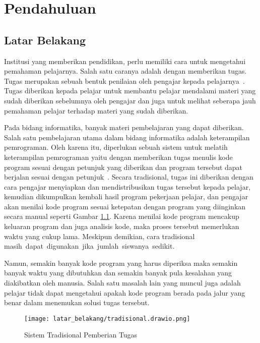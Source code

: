 \chapter{Pendahuluan}
\label{chap:intro}

\section{Latar Belakang}
\label{sec:1:latar_belakang}

Institusi yang memberikan pendidikan, perlu memiliki cara untuk mengetahui pemahaman pelajarnya. Salah satu caranya adalah dengan memberikan tugas. Tugas merupakan sebuah bentuk penilaian oleh pengajar kepada pelajarnya~\cite{febriana:plagiarisme}. Tugas diberikan kepada pelajar untuk membantu pelajar mendalami materi yang sudah diberikan sebelumnya oleh pengajar dan juga untuk melihat seberapa jauh pemahaman pelajar terhadap materi yang sudah diberikan.

Pada bidang informatika, banyak materi pembelajaran yang dapat diberikan. Salah satu pembelajaran utama dalam bidang informatika adalah keterampilan pemrograman. Oleh karena itu, diperlukan sebuah sistem untuk melatih keterampilan pemrograman yaitu dengan memberikan tugas menulis kode program sesuai dengan petunjuk yang diberikan dan program tersebut dapat berjalan sesuai dengan petunjuk~\cite{onder:judge}. Secara tradisional, tugas ini diberikan dengan cara pengajar menyiapkan dan mendistribusikan tugas tersebut kepada pelajar, kemudian dikumpulkan kembali hasil program pekerjaan pelajar, dan pengajar akan menilai kode program sesuai ketepatan dengan program yang diinginkan secara manual seperti Gambar \ref{fig:1:tradisional}. Karena menilai kode program mencakup keluaran program dan juga analisis kode, maka proses tersebut memerlukan waktu yang cukup lama. 
Meskipun demikian, cara tradisional \mbox{masih dapat digunakan jika jumlah siswanya sedikit.}

Namun, semakin banyak kode program yang harus diperiksa maka semakin banyak waktu yang dibutuhkan dan semakin banyak pula kesalahan yang diakibatkan oleh manusia. Salah satu masalah lain yang muncul juga adalah pelajar tidak dapat mengetahui apakah kode program berada pada jalur yang benar dalam menemukan solusi tugas tersebut.

\begin{figure}[H]
    \centering
    \texttt{[image: latar\_belakang/tradisional.drawio.png]}
    \caption[Sistem Tradisional Pemberian Tugas]{Sistem Tradisional Pemberian Tugas}
    \label{fig:1:tradisional}
\end{figure}

